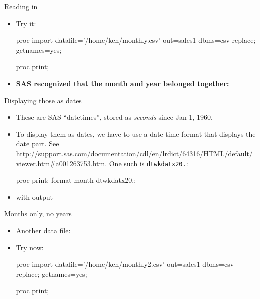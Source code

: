 \documentclass[unknownkeysallowed]{beamer}\usepackage[]{graphicx}\usepackage[]{color}
\begin{document}
\begin{frame}[fragile]{Reading in}
  \begin{itemize}
    
    \item Try it:
    
    \begin{Sascode}[store=jahaq]
proc import
  datafile='/home/ken/monthly.csv'
  out=sales1
  dbms=csv
  replace;
  getnames=yes;
  
proc print;  
    \end{Sascode}

  \item \textbf{SAS recognized that the month and year belonged together:}

    
  \end{itemize}
\end{frame}

\begin{frame}[fragile]{Displaying those as dates}
  
  \begin{itemize}
  \item These are SAS ``datetimes'', stored as \emph{seconds} since
    Jan 1, 1960.
  \item To display them as dates, we have to use a date-time format
    that displays the date part. See
    \url{http://support.sas.com/documentation/cdl/en/lrdict/64316/HTML/default/viewer.htm#a001263753.htm}. One
    such is \texttt{dtwkdatx20.}:
    
    \begin{Sascode}[store=ceral]
proc print;
  format month dtwkdatx20.;
    \end{Sascode}
    
    \item with output
      
    
  \end{itemize}
  
\end{frame}

\begin{frame}[fragile]{Months only, no years}
  
  \begin{itemize}
  \item Another data file:
    
    

  \item Try now:
    
    \begin{Sascode}[store=hotoc]
proc import
  datafile='/home/ken/monthly2.csv'
  out=sales1
  dbms=csv
  replace;
  getnames=yes;
  
proc print;
    \end{Sascode}


\end{itemize}
  
\end{frame}
\end{document}
